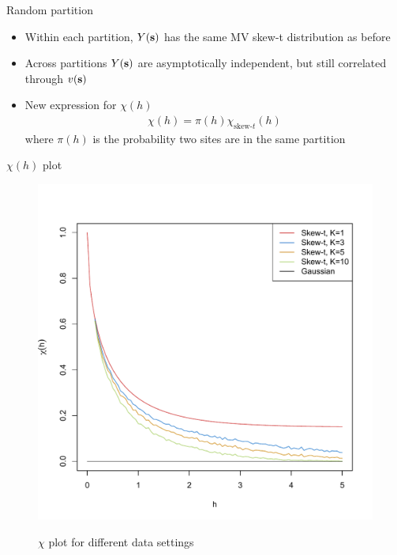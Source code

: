 \documentclass{beamer}
\begin{document}
\begin{frame}{Random partition}
  \begin{itemize} \setlength{\itemsep}{1em}
    \item Within each partition, $Y(\mbox{\bf s})$ has the same MV skew-t distribution as before
    \item Across partitions $Y(\mbox{\bf s})$ are asymptotically independent, but still correlated through $v(\mbox{\bf s})$
    \item New expression for $\chi(h)$
    \begin{align*}
      \chi(h) = \pi(h) \chi_{\text{skew-}t}(h)
    \end{align*}
    where $\pi(h)$ is the probability two sites are in the same partition
  \end{itemize}
\end{frame}

\begin{frame}{$\chi(h)$ plot}
  \vspace{-2em}
  \centering
  \begin{figure}
  \includegraphics[width=.65\linewidth]{./plots/pot/chi-h.pdf}\\[-0.2in]
  \caption{$\chi$ plot for different data settings}
  \end{figure}
\end{frame}
\end{document}
